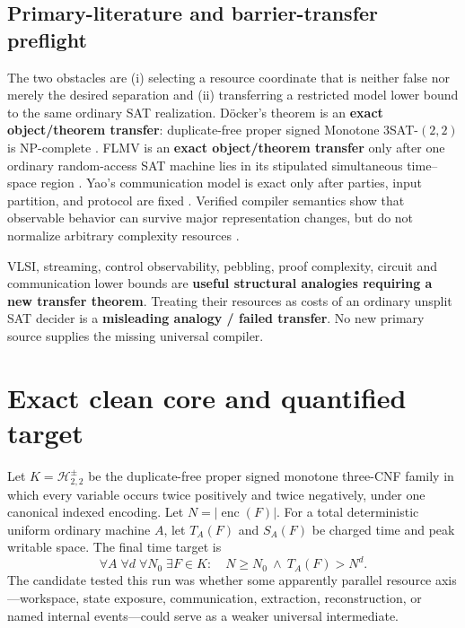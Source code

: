 \documentclass[11pt]{article}
\begin{document}
\subsection*{Primary-literature and barrier-transfer preflight}
The two obstacles are (i) selecting a resource coordinate that is neither
false nor merely the desired separation and (ii) transferring a restricted
model lower bound to the same ordinary SAT realization.  D\"ocker's theorem
is an \textbf{exact object/theorem transfer}: duplicate-free proper signed
Monotone $3$SAT-$(2,2)$ is NP-complete \cite{Docker19}.  FLMV is an
\textbf{exact object/theorem transfer} only after one ordinary random-access
SAT machine lies in its stipulated simultaneous time--space region
\cite{FLMV05}.  Yao's communication model is exact only after parties, input
partition, and protocol are fixed \cite{Yao79}.  Verified compiler semantics
show that observable behavior can survive major representation changes, but
do not normalize arbitrary complexity resources \cite{Leroy09}.

VLSI, streaming, control observability, pebbling, proof complexity, circuit
and communication lower bounds are \textbf{useful structural analogies
requiring a new transfer theorem}.  Treating their resources as costs of an
ordinary unsplit SAT decider is a \textbf{misleading analogy / failed
transfer}.  No new primary source supplies the missing universal compiler.

\section{Exact clean core and quantified target}
Let $K=\mathcal H^{\pm}_{2,2}$ be the duplicate-free proper signed monotone
three-CNF family in which every variable occurs twice positively and twice
negatively, under one canonical indexed encoding.  Let
$N=|\operatorname{enc}(F)|$.  For a total deterministic uniform ordinary
machine $A$, let $T_A(F)$ and $S_A(F)$ be charged time and peak writable space.
The final time target is
\begin{equation}
\tag{WT}
\forall A\;\forall d\;\forall N_0\;\exists F\in K:\quad
N\ge N_0\ \land\ T_A(F)>N^d.
\end{equation}
The candidate tested this run was whether some apparently parallel resource
axis---workspace, state exposure, communication, extraction, reconstruction,
or named internal events---could serve as a weaker universal intermediate.
\end{document}
